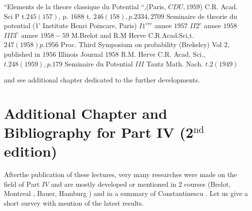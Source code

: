 \begin{thebibliography}{99}
\pageoriginale ``Elements de la theore classique du Potential
  ``,(Paris, $CDU, 1959$) C.R. Acad. Sci P t.$245(157)$, p. $1688$
  t. $246(158),p.2334,2709$ Seminaire de theorie du potential (1'
  Institute Henri Poincare, Paris) $I 1^{ere}$ annee $1957$ $II 2^e$
  annee $1958$ $III 3^e$ annee $1958-59$ 
 {M.Brelot and R.M Herve}  C.R.Acad.Sci,t.$247 (1958)p.1956$
  Proc. Third Symposium on probability
  (Brekeley) Vol $2$, published in $1956$ Illinois Journal $1958$ 
 {R.M. Herve}  C.R. Acad. Sci., $t.248(1959),p.179$
  Seminaire du Potential $III$
 {Tautz} Math. Nach. $t.2(1949)$
\end{thebibliography}
and see additional chapter dedicated to the further developments.

\chapter[Additional Chapter and Bibliography for Part IV...]{Additional Chapter and Bibliography for Part IV
  (2$^{\text{nd}}$ edition)} 

After\pageoriginale the publication of these lectures, very many researches were
made on the field of Part $IV$ and are mostly developed or mentioned in
$2$ courses (Brelot, Montreal \cite{21}, Bauer, Hamburg \cite{4}) and in a
summary of Constantinescu \cite{27}. Let us give a short survey with
mention of the latest results. 

